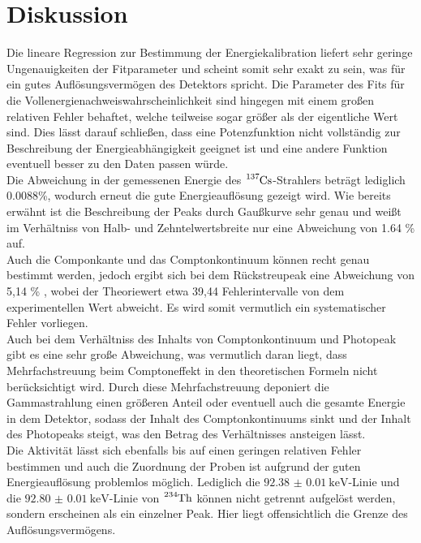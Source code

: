 \section{Diskussion}
Die lineare Regression zur Bestimmung der Energiekalibration liefert sehr geringe Ungenauigkeiten
der Fitparameter und scheint somit sehr exakt zu sein, was für ein gutes Auflösungsvermögen
des Detektors spricht. Die Parameter des Fits für die Vollenergienachweiswahrscheinlichkeit sind hingegen
mit einem großen relativen Fehler behaftet, welche teilweise sogar größer als der
eigentliche Wert sind. Dies lässt darauf schließen, dass eine Potenzfunktion
nicht vollständig zur Beschreibung der Energieabhängigkeit geeignet ist und
eine andere Funktion eventuell besser zu den Daten passen würde. \\
Die Abweichung in der gemessenen Energie des $\ce{^{137}Cs}$-Strahlers beträgt lediglich
0.0088\%, wodurch erneut die gute Energieauflösung gezeigt wird. Wie bereits erwähnt
ist die Beschreibung der Peaks durch Gaußkurve sehr genau und weißt im Verhältniss
von Halb- und Zehntelwertsbreite nur eine Abweichung von 1.64 \% auf. \\
Auch die Componkante und das Comptonkontinuum können recht genau bestimmt werden,
jedoch ergibt sich bei dem Rückstreupeak eine Abweichung von 5,14 \% , wobei der Theoriewert etwa 39,44
Fehlerintervalle von dem experimentellen Wert abweicht. Es wird somit vermutlich ein systematischer Fehler
vorliegen. \\
Auch bei dem Verhältniss des Inhalts von Comptonkontinuum und Photopeak gibt es eine
sehr große Abweichung, was vermutlich daran liegt, dass Mehrfachstreuung beim
Comptoneffekt in den theoretischen Formeln nicht berücksichtigt wird. Durch diese
Mehrfachstreuung deponiert die Gammastrahlung einen größeren Anteil oder eventuell auch die
gesamte Energie in dem Detektor, sodass der Inhalt des Comptonkontinuums sinkt und der
Inhalt des Photopeaks steigt, was den Betrag des Verhältnisses ansteigen lässt. \\
Die Aktivität lässt sich ebenfalls bis auf einen geringen
relativen Fehler bestimmen und auch die Zuordnung der Proben ist aufgrund der
guten Energieauflösung problemlos möglich. Lediglich die $\SI{92.38(1)}{\kilo\electronvolt}$-Linie
und die $\SI{92.80(1)}{\kilo\electronvolt}$-Linie von $\ce{^{234}Th}$ können nicht
getrennt aufgelöst werden, sondern erscheinen als ein einzelner Peak. Hier liegt offensichtlich
die Grenze des Auflösungsvermögens.
